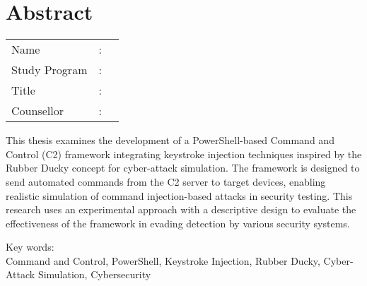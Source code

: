 %
%
%

\chapter*{Abstract}

\vspace*{0.2cm}
{
	\setlength{\parindent}{0pt}
	
	\begin{tabular}{@{}l l p{10cm}}
		Name&: & \penulis \\
		Study Program&: & \program \\
		Title&: & \judulInggris \\
		Counsellor&: & \pembimbing \\
	\end{tabular}

	\bigskip
	\bigskip

	This thesis examines the development of a PowerShell-based Command and Control (C2) framework integrating keystroke injection techniques inspired by the Rubber Ducky concept for cyber-attack simulation. The framework is designed to send automated commands from the C2 server to target devices, enabling realistic simulation of command injection-based attacks in security testing. This research uses an experimental approach with a descriptive design to evaluate the effectiveness of the framework in evading detection by various security systems.

	\bigskip

	Key words:\\
	Command and Control, PowerShell, Keystroke Injection, Rubber Ducky, Cyber-Attack Simulation, Cybersecurity
}

\newpage
